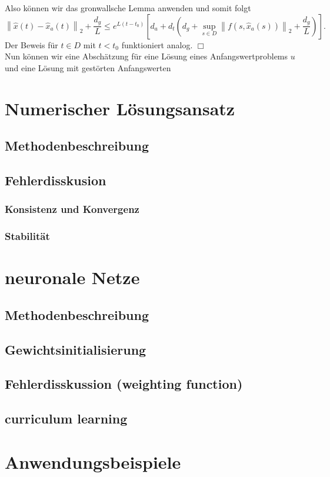 \documentclass[
    paper=a4, %
    fontsize=10pt,  %
]{article}         %
\newcommand{\qedwhite}{\hfill \ensuremath{\Box}}
\begin{document}
    Also können wir das gronwallsche Lemma anwenden und somit folgt
    \[
        \left\lVert \hat{x}(t) - \hat{x}_a(t)\right\rVert_2 + \frac{d_g}{L} \leq
        e^{L(t-t_0)}\left[d_a + d_t(d_g + \sup_{s\in D}\left\lVert f(s,\hat{x}_a(s)) \right\rVert_2 + \frac{d_g}{L})\right].
    \]
    Der Beweis für $t \in D$ mit $t<t_0$ funktioniert analog. \qedwhite\\
    Nun können wir eine Abschätzung für eine Lösung eines Anfangswertproblems $u$ und eine Lösung mit gestörten
    Anfangswerten

    \section{Numerischer Lösungsansatz}
    \subsection{Methodenbeschreibung}
    \subsection{Fehlerdisskusion}
    \subsubsection{Konsistenz und Konvergenz}
    \subsubsection{Stabilität}

    \section{neuronale Netze}
    \subsection{Methodenbeschreibung}
    \subsection{Gewichtsinitialisierung}
    \subsection{Fehlerdisskussion (weighting function)}
    \subsection{curriculum learning}

    \section{Anwendungsbeispiele}

    \newpage
    \printbibliography[heading=bibintoc]
    \newpage
    \listoffigures
\end{document}
